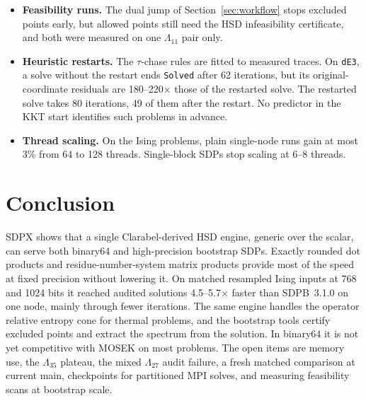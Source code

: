 \documentclass[11pt]{article}
\newcommand{\code}[1]{\texttt{#1}}
\begin{document}
\begin{itemize}
    repair the auxiliary row. \code{f64\_large} (a large SU(2) SDP) has PSD
    blocks whose kernel is shared by all constraint matrices and $b$; SDPX
    ends \code{AlmostSolved}, and MOSEK's ``optimal'' points fail the
    $10^{-6}$ audit. A Goldstone LP/SOC problem at 256 bits stalls with the
    dual residual at $10^{-8}$ to $10^{-11}$ while the primal residual reaches
    $10^{-29}$. A gravity problem in binary64 was \code{Solved} with
    $r_d = 4.01\times10^{-6}$ above its $2\times10^{-6}$ audit before an
    earlier fix and has not been re-run since.
  \item \textbf{Feasibility runs.} The dual jump of
    Section~\ref{sec:workflow} stops excluded points early, but allowed
    points still need the HSD infeasibility certificate, and both were
    measured on one $\Lambda_{11}$ pair only.
  \item \textbf{Heuristic restarts.} The $\tau$-chase rules are fitted to
    measured traces. On \code{dE3}, a solve without the restart ends
    \code{Solved} after 62 iterations, but its original-coordinate residuals
    are 180--220$\times$ those of the restarted solve. The restarted solve
    takes 80 iterations, 49 of them after the restart. No predictor in the
    KKT start identifies such problems in advance.
  \item \textbf{Thread scaling.} On the Ising problems, plain single-node runs
    gain at most 3\% from 64 to 128 threads. Single-block SDPs stop scaling at 6--8 threads.
\end{itemize}

\section{Conclusion}
\label{sec:conclusion}

SDPX shows that a single Clarabel-derived HSD engine, generic over the scalar,
can serve both binary64 and high-precision bootstrap SDPs. Exactly rounded dot
products and residue-number-system matrix products provide most of the speed
at fixed precision without lowering it. On matched resampled Ising inputs at
768 and 1024 bits it reached audited solutions 4.5--5.7$\times$ faster than
SDPB~3.1.0 on one node, mainly through fewer iterations. The same engine
handles the operator relative entropy cone for thermal problems, and the
bootstrap tools certify excluded points and extract the spectrum from the
solution. In binary64 it is not yet competitive with MOSEK on most
problems. The open items are memory use, the $\Lambda_{35}$ plateau, the
mixed $\Lambda_{27}$ audit failure, a fresh matched comparison at
current main, checkpoints for partitioned MPI solves, and measuring
feasibility scans at bootstrap scale.
\end{document}
